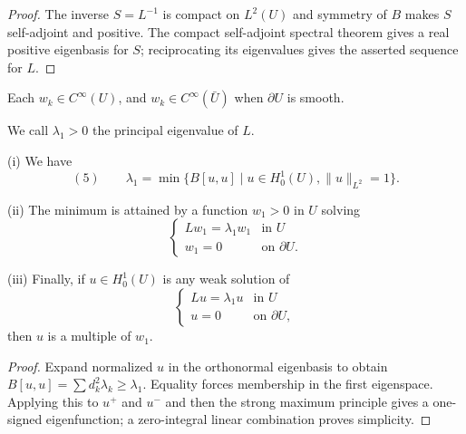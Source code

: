 \begin{proof}
\sketch The inverse $S=L^{-1}$ is compact on $L^2(U)$ and symmetry of $B$ makes $S$ self-adjoint and positive. The compact self-adjoint spectral theorem gives a real positive eigenbasis for $S$; reciprocating its eigenvalues gives the asserted sequence for $L$.
\end{proof}

\begin{remark}
\label{rem:eigenfunctions-smoothness}

Each $w_k\in C^\infty(U)$, and $w_k\in C^\infty(\bar U)$ when $\partial U$ is smooth.
\end{remark}

\begin{definition}
\label{def:principal-eigenvalue}

We call $\lambda_1 > 0$ the principal eigenvalue of $L$.
\end{definition}

\begin{theorem}
\label{thm:variational-principle-principal-eigenvalue}

(i) We have
$$(5) \qquad \lambda_1 = \min\{B[u,u] \mid u \in H_0^1(U), \|u\|_{L^2} = 1\}.$$

(ii) The minimum is attained by a function $w_1>0$ in $U$ solving
$$\begin{cases} Lw_1 = \lambda_1w_1 & \text{in } U \\ w_1 = 0 & \text{on } \partial U. \end{cases}$$

(iii) Finally, if $u \in H_0^1(U)$ is any weak solution of
$$\begin{cases} Lu = \lambda_1u & \text{in } U \\ u = 0 & \text{on } \partial U, \end{cases}$$
then $u$ is a multiple of $w_1$.
\end{theorem}

\begin{proof}
\sketch Expand normalized $u$ in the orthonormal eigenbasis to obtain $B[u,u]=\sum d_k^2\lambda_k\ge\lambda_1$. Equality forces membership in the first eigenspace. Applying this to $u^+$ and $u^-$ and then the strong maximum principle gives a one-signed eigenfunction; a zero-integral linear combination proves simplicity.
\end{proof}

